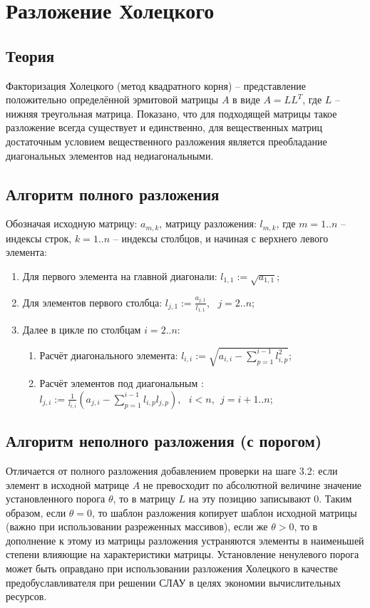 \section{Разложение Холецкого}

\subsection{Теория}

Факторизация Холецкого (метод квадратного корня) -- представление положительно определённой эрмитовой матрицы $A$ в виде $A = LL^T$, где $L$ -- нижняя треугольная матрица. Показано, что для подходящей матрицы такое разложение всегда существует и единственно, для вещественных матриц достаточным условием вещественного разложения является преобладание диагональных элементов над недиагональными.

\subsection{Алгоритм полного разложения}

Обозначая исходную матрицу: $a_{m,k}$, матрицу разложения: $l_{m,k}$, где $m = 1..n$ -- индексы строк, $k=1..n$ -- индексы столбцов, и начиная с верхнего левого элемента:
\begin{enumerate}
    \item Для первого элемента на главной диагонали: $l_{1,1} := \sqrt{a_{1,1}}$;

    \item Для элементов первого столбца: $l_{j,1} := \frac{a_{j,1}}{l_{1,1}}, ~~~ j=2..n$;

    \item Далее в цикле по столбцам $i=2..n$:
    \begin{enumerate}
        \item Расчёт диагонального элемента: $l_{i,i} := \sqrt{a_{i,i} - \sum_{p=1}^{i-1}l_{i,p}^2}$;

        \item Расчёт элементов под диагональным : $l_{j,i} := \frac{1}{l_{i,i}}(a_{j,i} - \sum_{p=1}^{i-1}l_{i,p}l_{j,p}), ~~~ i<n,~~j=i+1..n$;
    \end{enumerate}
\end{enumerate}

\subsection{Алгоритм неполного разложения (с порогом)}
Отличается от полного разложения добавлением проверки на шаге 3.2: если элемент в исходной матрице $A$ не превосходит по абсолютной величине значение установленного порога $\theta$, то в матрицу $L$ на эту позицию записывают 0. Таким образом, если $\theta = 0$, то шаблон разложения копирует шаблон исходной матрицы (важно при использовании разреженных массивов), если же $\theta>0$, то в дополнение к этому из матрицы разложения устраняются элементы в наименьшей степени влияющие на характеристики матрицы. Установление ненулевого порога может быть оправдано при использовании разложения Холецкого в качестве предобуславливателя при решении СЛАУ в целях экономии вычислительных ресурсов.

